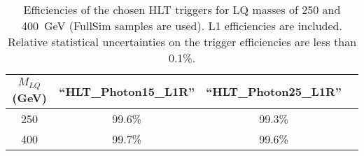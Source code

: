 \begin{table}[htbp]
\begin{center}
\begin{tabular}{|c|c|c|c|}
\hline\hline
$M_{LQ}$ (GeV)     & ``HLT\_Photon15\_L1R''  &  ``HLT\_Photon25\_L1R'' \\
\hline\hline
250                & 99.6\%   & 99.3\%  \\
400                & 99.7\%   & 99.6\%  \\
\hline\hline
\end{tabular}
\end{center}
\caption{Efficiencies of the chosen HLT triggers for LQ masses of 250 and 400~GeV (FullSim samples are used). L1 efficiencies are included.
Relative statistical uncertainties on the trigger efficiencies are less than 0.1\%.}
\label{tab:HLTEffic}
\end{table}






%

